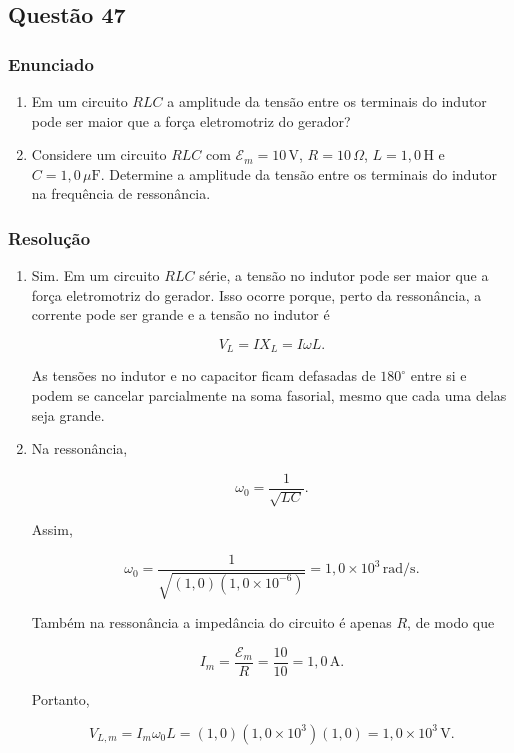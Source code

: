 \subsection{Questão 47}

\subsubsection{Enunciado}

\begin{enumerate}
    \item[(a)] Em um circuito \(RLC\) a amplitude da tensão entre os terminais do indutor pode ser maior que a força eletromotriz do gerador?
    
    \item[(b)] Considere um circuito \(RLC\) com \(\mathcal{E}_m = 10\,\text{V}\), \(R = 10\,\Omega\), \(L = 1{,}0\,\text{H}\) e \(C = 1{,}0\,\mu\text{F}\). Determine a amplitude da tensão entre os terminais do indutor na frequência de ressonância.
\end{enumerate}

\subsubsection{Resolução}

\begin{enumerate}
    \item[(a)] Sim. Em um circuito \(RLC\) série, a tensão no indutor pode ser
    maior que a força eletromotriz do gerador. Isso ocorre porque, perto da
    ressonância, a corrente pode ser grande e a tensão no indutor é

    \[
    V_L=I X_L=I\omega L.
    \]

    As tensões no indutor e no capacitor ficam defasadas de \(180^\circ\)
    entre si e podem se cancelar parcialmente na soma fasorial, mesmo que cada
    uma delas seja grande.

    \item[(b)] Na ressonância,

    \[
    \omega_0=\frac{1}{\sqrt{LC}}.
    \]

    Assim,

    \[
    \omega_0=
    \frac{1}{\sqrt{(1{,}0)(1{,}0\times 10^{-6})}}
    =1{,}0\times 10^3\,\text{rad/s}.
    \]

    Também na ressonância a impedância do circuito é apenas \(R\), de modo que

    \[
    I_m=\frac{\mathcal{E}_m}{R}
    =\frac{10}{10}=1{,}0\,\text{A}.
    \]

    Portanto,

    \[
    V_{L,m}=I_m\omega_0 L
    =(1{,}0)(1{,}0\times 10^3)(1{,}0)
    =1{,}0\times 10^3\,\text{V}.
    \]
\end{enumerate}

\vspace{1cm}
